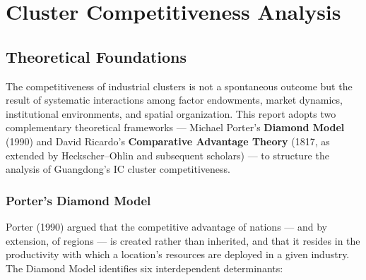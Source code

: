 \documentclass[12pt,a4paper]{article}
\begin{document}
\section{Cluster Competitiveness Analysis}
\label{sec:cluster}

\subsection{Theoretical Foundations}
\label{sec:theory}

The competitiveness of industrial clusters is not a spontaneous outcome
but the result of systematic interactions among factor endowments, market
dynamics, institutional environments, and spatial organization. This report
adopts two complementary theoretical frameworks — Michael Porter's
\textbf{Diamond Model} (1990) and David Ricardo's \textbf{Comparative
Advantage Theory} (1817, as extended by Heckscher--Ohlin and subsequent
scholars) — to structure the analysis of Guangdong's IC cluster
competitiveness.

\subsubsection{Porter's Diamond Model}

Porter (1990) argued that the competitive advantage of nations — and by
extension, of regions — is created rather than inherited, and that it
resides in the productivity with which a location's resources are deployed
in a given industry. The Diamond Model identifies six interdependent
determinants:
\end{document}
